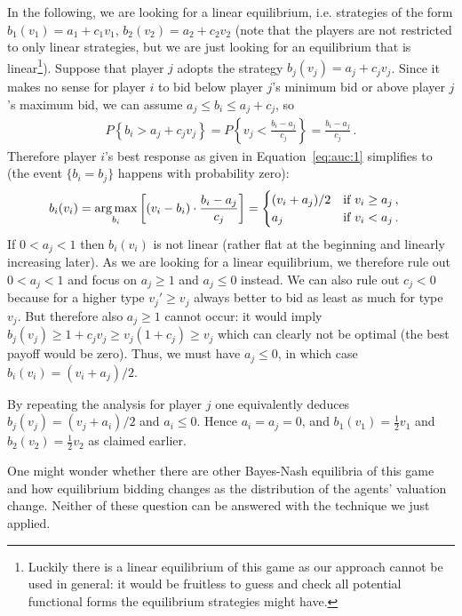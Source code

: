In the following, we are looking for a linear equilibrium, i.e. strategies of the form $b_1(v_1) = a_1 + c_1 v_1$, $b_2(v_2) = a_2 + c_2 v_2$ (note that the players are not restricted to only linear strategies, but we are just looking for an equilibrium that is linear\footnote{Luckily there is a linear equilibrium of this game as our approach cannot be used in general: it would be fruitless to guess and check all potential functional forms the equilibrium strategies might have.}).
Suppose that player $j$ adopts the strategy $b_j(v_j) = a_j + c_jv_j$. Since it makes no sense for player $i$ to bid below player $j$'s minimum bid or above player $j$'s maximum bid, we can assume $a_j \leq b_i \leq a_j + c_j$, so 
\begin{align}
 P \left\{b_i > a_j + c_j v_j\right\} = P \left\{v_j < \frac{b_i - a_j}{c_j} \right\} = \frac{b_i - a_j}{c_j}\,.
\end{align}
Therefore player $i$'s best response as given in Equation~\eqref{eq:auc:1} simplifies to (the event $\{b_i = b_j\}$ happens with probability zero):
\begin{align}
b_i(v_i) &=  \operatorname*{arg\,max}_{b_i}  \left[\left(v_i - b_i\right) \cdot \frac{b_i-a_j}{c_j}\right] = \begin{cases}
 (v_i + a_j)/2 &\text{if } v_i \geq a_j\,,\\
 a_j & \text{if } v_i < a_j\,.
\end{cases}
\end{align}
If $0 < a_j < 1$ then $b_i(v_i)$ is not linear (rather flat at the beginning and linearly increasing later). As we are looking for a linear equilibrium, we therefore rule out $0 < a_j < 1$ and focus on $a_j \geq 1$ and $a_j \leq 0$ instead. We can also rule out $c_j < 0$ because for a higher type $v_j' \geq v_j$ always better to bid as least as much for type $v_j$. But therefore also $a_j \geq 1$ cannot occur: it would imply $b_j(v_j) \geq 1 + c_j v_j \geq v_j (1+c_j) \geq v_j$ which can clearly not be optimal (the best payoff would be zero). Thus, we must have $a_j \leq 0$, in which case $b_i(v_i) = (v_i + a_j)/2$.

By repeating the analysis for player $j$ one equivalently deduces $b_j(v_j)=(v_j+a_i)/2$ and $a_i \leq 0$. Hence $a_i=a_j=0$, and $b_1(v_1)=\frac{1}{2}v_1$ and $b_2(v_2)=\frac{1}{2}v_2$ as claimed earlier.

One might wonder whether there are other Bayes-Nash equilibria of this game and how equilibrium bidding changes as the distribution of the agents' valuation change. Neither of these question can be answered with the technique we just applied. 


